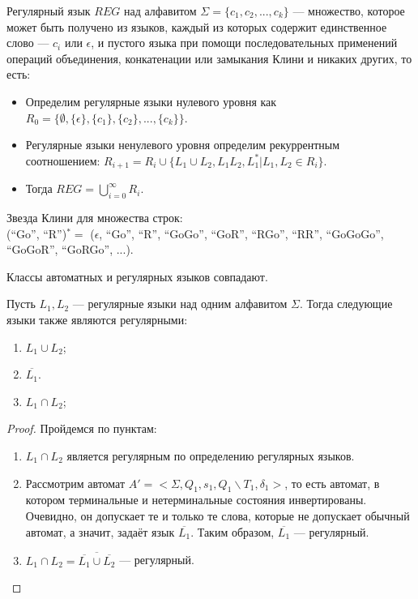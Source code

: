     \begin{Def}
        Регулярный язык $REG$ над алфавитом $\Sigma = \{c_1, c_2, ...,c_k\}$ — множество, которое может быть получено из языков, каждый из которых содержит единственное слово --- $c_i$ или $\epsilon$, и пустого языка при помощи последовательных применений операций объединения, конкатенации или замыкания Клини и никаких других, то есть:
        \begin{itemize}
            \item Определим регулярные языки нулевого уровня как $R_0 = \{\emptyset, \{\epsilon\}, \{c_1\}, \{c_2\}, ...,\{c_k\}\}$.
            \item Регулярные языки ненулевого уровня определим рекуррентным соотношением: $R_{i + 1} = R_i \cup \{L_1 \cup L_2, L_1L_2, L^*_1 | L_1, L_2 \in R_i\}$.
            \item Тогда $REG = \bigcup_{i = 0}^{\infty} R_i$.
        \end{itemize}   
    \end{Def}
    \begin{Example}
        Звезда Клини для множества строк:\\ (``Go'', ``R'')$^* = $
        ($\epsilon$, ``Go'', ``R'', ``GoGo'', ``GoR'', ``RGo'', ``RR'', ``GoGoGo'', ``GoGoR'', ``GoRGo'', ...).
    \end{Example}
    \begin{Thm}
        Классы автоматных и регулярных языков совпадают.
    \end{Thm}
    \begin{Thm}
        Пусть $L_1, L_2$ --- регулярные языки над одним алфавитом $\Sigma$. Тогда следующие языки также являются регулярными:
        \begin{enumerate}
            \item $L_1 \cup L_2$;
            \item $\overline{L_1}$.
            \item $L_1 \cap L_2$;
        \end{enumerate}
    \end{Thm}
    \begin{proof}
        Пройдемся по пунктам:
        \begin{enumerate}
            \item $L_1 \cap L_2$ является регулярным по определению регулярных языков.
            \item Рассмотрим автомат $A' = <\Sigma, Q_1, s_1,Q_1 \backslash T_1,\delta_1>$, то есть автомат, в котором терминальные и нетерминальные состояния инвертированы. Очевидно, он допускает те и только те слова, которые не допускает обычный автомат, а значит, задаёт язык $\overline{L_1}$. Таким образом, $\overline{L_1}$ --- регулярный.
            \item $L_1 \cap L_2 = \overline{\overline{L_1} \cup \overline{L_2}}$ --- регулярный.
        \end{enumerate}
    \end{proof}


